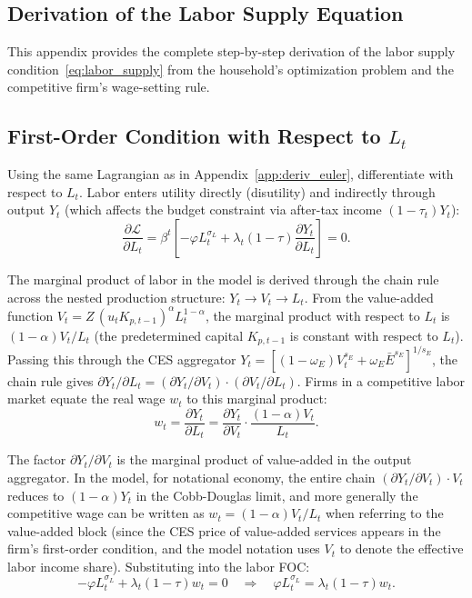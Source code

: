 	\subsection{Derivation of the Labor Supply Equation} \label{app:deriv_labor}
	
	This appendix provides the complete step-by-step derivation of the labor supply condition~\eqref{eq:labor_supply} from the household's optimization problem and the competitive firm's wage-setting rule.
	
	\subsection*{First-Order Condition with Respect to $L_t$}
	
	Using the same Lagrangian as in Appendix~\ref{app:deriv_euler}, differentiate with respect to $L_t$. Labor enters utility directly (disutility) and indirectly through output $Y_t$ (which affects the budget constraint via after-tax income $(1-\tau_t)Y_t$):
	\begin{equation*}
		\frac{\partial \mathcal{L}}{\partial L_t}
		= \beta^t\left[-\varphi L_t^{\sigma_L} + \lambda_t (1-\tau) \frac{\partial Y_t}{\partial L_t}\right] = 0.
	\end{equation*}
	
	\noindent The marginal product of labor in the model is derived through the chain rule across the nested production structure: $Y_t \to V_t \to L_t$. From the value-added function $V_t = Z\,(u_t K_{p,t-1})^\alpha L_t^{1-\alpha}$, the marginal product with respect to $L_t$ is $(1-\alpha)V_t/L_t$ (the predetermined capital $K_{p,t-1}$ is constant with respect to $L_t$). Passing this through the CES aggregator $Y_t = [(1-\omega_E)V_t^{s_E} + \omega_E \bar{E}^{s_E}]^{1/s_E}$, the chain rule gives $\partial Y_t/\partial L_t = (\partial Y_t / \partial V_t)\cdot(\partial V_t / \partial L_t)$. Firms in a competitive labor market equate the real wage $w_t$ to this marginal product:
	\begin{equation*}
		w_t = \frac{\partial Y_t}{\partial L_t}
		= \frac{\partial Y_t}{\partial V_t} \cdot \frac{(1-\alpha)V_t}{L_t}.
	\end{equation*}
	
	The factor $\partial Y_t / \partial V_t$ is the marginal product of value-added in the output aggregator. In the model, for notational economy, the entire chain $(\partial Y_t/\partial V_t)\cdot V_t$ reduces to $(1-\alpha)Y_t$ in the Cobb-Douglas limit, and more generally the competitive wage can be written as $w_t = (1-\alpha) V_t / L_t$ when referring to the value-added block (since the CES price of value-added services appears in the firm's first-order condition, and the model notation uses $V_t$ to denote the effective labor income share). Substituting into the labor FOC:
	\begin{equation*}
		-\varphi L_t^{\sigma_L} + \lambda_t (1-\tau) w_t = 0
		\quad \Longrightarrow \quad
		\varphi L_t^{\sigma_L} = \lambda_t (1-\tau) w_t.
	\end{equation*}
	
